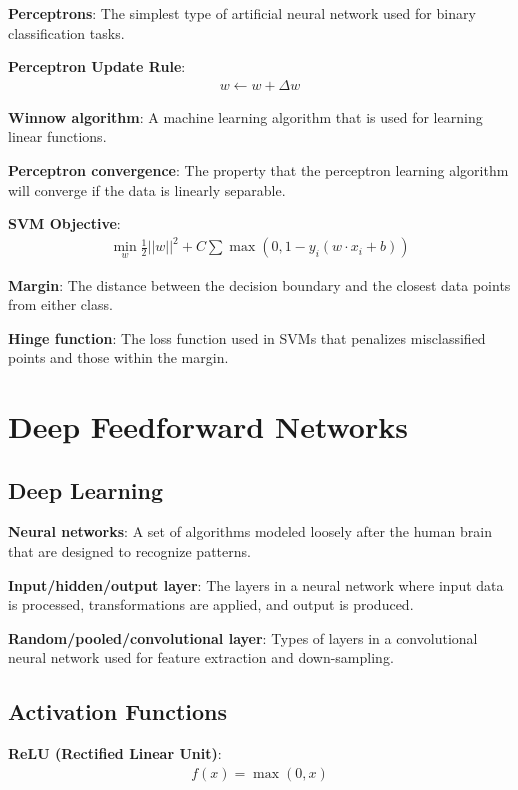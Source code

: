 \documentclass{article}
\begin{document}
\textbf{Perceptrons}: The simplest type of artificial neural network used for binary classification tasks.

\textbf{Perceptron Update Rule}: 
\begin{align*}
    w \leftarrow w + \Delta w
\end{align*}

\textbf{Winnow algorithm}: A machine learning algorithm that is used for learning linear functions.

\textbf{Perceptron convergence}: The property that the perceptron learning algorithm will converge if the data is linearly separable.

\textbf{SVM Objective}: 
\begin{align*}
    \min_w \frac{1}{2} ||w||^2 + C \sum \max(0, 1 - y_i (w \cdot x_i + b))
\end{align*}

\textbf{Margin}: The distance between the decision boundary and the closest data points from either class.

\textbf{Hinge function}: The loss function used in SVMs that penalizes misclassified points and those within the margin.

\section{Deep Feedforward Networks}

\subsection{Deep Learning}
\textbf{Neural networks}: A set of algorithms modeled loosely after the human brain that are designed to recognize patterns.

\textbf{Input/hidden/output layer}: The layers in a neural network where input data is processed, transformations are applied, and output is produced.

\textbf{Random/pooled/convolutional layer}: Types of layers in a convolutional neural network used for feature extraction and down-sampling.

\subsection{Activation Functions}
\textbf{ReLU (Rectified Linear Unit)}: 
\begin{align*}
    f(x) = \max(0, x)
\end{align*}
\end{document}

